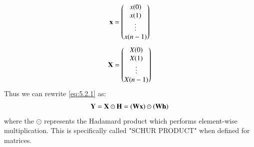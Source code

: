 \documentclass[journal,12pt,twocolumn]{IEEEtran}
\theoremstyle{remark}
\begin{document}
\begin{enumerate}[label=\thesection.\arabic*]
\begin{align}
	\mathbf{x} = 
	\begin{pmatrix}
		x(0) \\ x(1) \\ \vdots \\ x(n - 1)
	\end{pmatrix}
\end{align}
\begin{align}
	\mathbf{X} = 
	\begin{pmatrix}
		X(0) \\ X(1) \\ \vdots \\ X(n - 1)
	\end{pmatrix}
\end{align}
Thus we can rewrite  \eqref{eq:5.2.1} as:
\begin{align}
	\mathbf{Y} = \mathbf{X}\odot\mathbf{H} = \left(\mathbf{W}\mathbf{x}\right)\odot\left(\mathbf{W}\mathbf{h}\right)
\end{align}
where the $\odot$ represents the Hadamard product which performs element-wise multiplication.
This is specifically called "SCHUR PRODUCT" when defined for matrices.
\end{enumerate}
\end{document}
